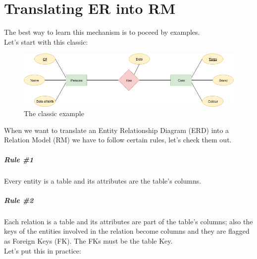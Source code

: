 \documentclass[class=book, crop=false, oneside]{standalone}
\begin{document}

\chapter{Translating ER into RM}
The best way to learn this mechanism is to poceed by examples.\\
Let's start with this classic:

\begin{figure}[H]
	\centering
	\includegraphics[width=\textwidth,keepaspectratio]{diagram1_00.png}
	\caption{The classic example}
	\label{diagram1_00}
\end{figure}

When we want to translate an Entity Relationship Diagram (ERD) into a Relation Model (RM) we have to follow certain rules, let's check them out.
\paragraph*{Rule \#1} Every entity is a table and its attributes are the table's columns.
\paragraph*{Rule \#2} Each relation is a table and its attributes are part of the table's columns; also the keys of the entities involved in the relation become columns and they are flagged as Foreign Keys (FK). The FKs must be the table Key.\\

Let's put this in practice:
\vskip 20pt
\end{document}
